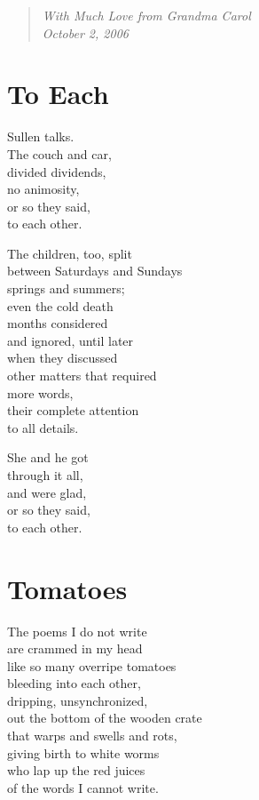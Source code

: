 \documentclass[twoside,10pt]{book}
\begin{document}
\begin{quote}
\emph{With Much Love from Grandma Carol\\
October 2, 2006}
\end{quote}


\clearpage
\section{To Each}

Sullen talks.\\
The couch and car,\\
divided dividends,\\
no animosity,\\
or so they said,\\
to each other.

The children, too, split\\
between Saturdays and Sundays\\
springs and summers;\\
even the cold death\\
months considered\\
and ignored, until later\\
when they discussed\\
other matters that required\\
more words,\\
their complete attention\\
to all details.

She and he got\\
through it all,\\
and were glad,\\
or so they said,\\
to each other.


\clearpage
\section{Tomatoes}

The poems I do not write\\
are crammed in my head\\
like so many overripe tomatoes\\
bleeding into each other,\\
dripping, unsynchronized,\\
out the bottom of the wooden crate\\
that warps and swells and rots,\\
giving birth to white worms\\
who lap up the red juices\\
of the words I cannot write.
\end{document}
